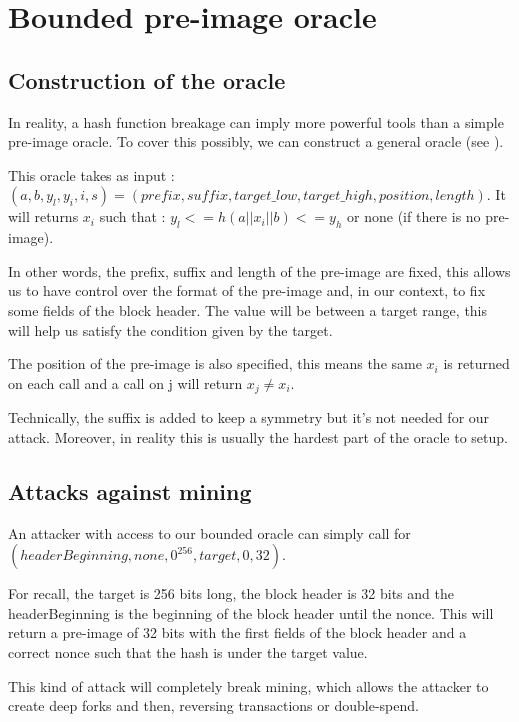 \section{Bounded pre-image oracle}


  \subsection{Construction of the oracle}

In reality, a hash function breakage can imply more powerful tools than a simple pre-image oracle. To cover this possibly, we can construct a general oracle (see \cite{broken_crypto_primitives}). \newline

This oracle takes as input : $(a, b, y_l, y_i, i, s) = (prefix, suffix, target\_low, target\_high, position, length)$. It will returns $x_i$ such that : $y_l <= h(a || x_i || b) <= y_h$ or none (if there is no pre-image). \newline

In other words, the prefix, suffix and length of the pre-image are fixed, this allows us to have control over the format of the pre-image and, in our context, to fix some fields of the block header. The value will be between a target range, this will help us satisfy the condition given by the target.

The position of the pre-image is also specified, this means the same $x_i$ is returned on each call and a call on j will return $x_j \neq x_i$. \newline

Technically, the suffix is added to keep a symmetry but it's not needed for our attack. Moreover, in reality this is usually the hardest part of the oracle to setup.

  \subsection{Attacks against mining}


An attacker with access to our bounded oracle can simply call for $(headerBeginning, none, 0^{256}, target, 0, 32)$. \newline

For recall, the target is 256 bits long, the block header is 32 bits and the headerBeginning is the beginning of the block header until the nonce. This will return a pre-image of 32 bits with the first fields of the block header and a correct nonce such that the hash is under the target value. \newline

This kind of attack will completely break mining, which allows the attacker to create deep forks and then, reversing transactions or double-spend.
